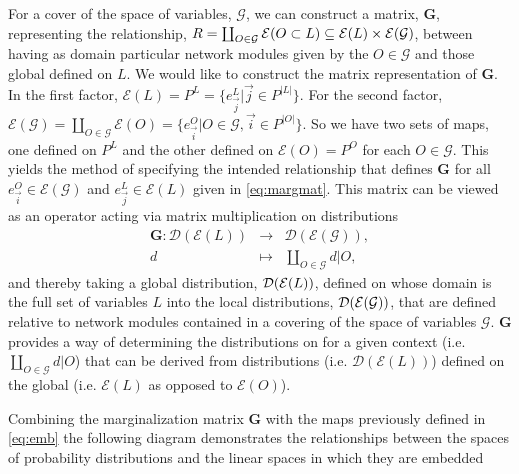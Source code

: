 For a cover of the space of variables, $\mathcal{G}$, we can construct a matrix, $\mathbf{G}$, representing the relationship, $R = \coprod_{O \in \mathcal{G}} \mathcal{E}(O \subset L) \subseteq \mathcal{E}(L) \times \mathcal{E} (\mathcal{G})$, between \gnpm{} having as domain particular network modules given by the $O \in \mathcal{G}$ and those global \gnpm{} defined on $L$. We would like to construct the matrix representation of $\mathbf{G}$. In the first factor, $\mathcal{E}(L) = P^L = \{e^{L}_{\vec{j}} | \vec{j} \in P^{|L|}\}$.
For the second factor, $ \mathcal{E}(\mathcal{G}) = \coprod_{O \in \mathcal{G}} \mathcal{E}(O) = \{e^O_{\vec{i}} | O \in \mathcal{G}, \vec{i} \in P^{|O|} \}$.
 So we have two sets of maps, one defined on $P^L$ and the other defined on $\mathcal{E}(O) = P^O$ for each $O \in \mathcal{G}$. This yields the method of specifying the intended relationship that defines $\mathbf{G}$ for all $e^O_{\vec{i}} \in \mathcal{E}(\mathcal{G})$ and $e^{L}_{\vec{j}} \in \mathcal{E}(L)$ given in \autoref{eq:margmat}.
This matrix can be viewed as an operator acting via matrix multiplication on distributions
\begin{eqnarray*}
\mathbf{G} \colon \mathcal{D}(\mathcal{E}(L)) &\rightarrow& \mathcal{D}( \mathcal{E}(\mathcal{G})),\\
d &\mapsto& \coprod_{O \in \mathcal{G}} d|O,
\end{eqnarray*}
and thereby taking a global distribution, $\mathcal{D} (\mathcal{E}(L))$, defined on \gnpm{} whose domain is the full set of variables $L$ into the local distributions, $\mathcal{D} (\mathcal{E}(\mathcal{G}))$, that are defined relative to network modules contained in a covering of the space of variables $\mathcal{G}$. $\mathbf{G}$ provides a way of determining the distributions on \gnpm{} for a given context (i.e. $\coprod_{O \in \mathcal{G}} d|O$) that can be derived from distributions (i.e. $\mathcal{D} ( \mathcal{E}(L) )$) defined on the global \gnpm{} (i.e. $\mathcal{E}(L)$ as opposed to $\mathcal{E}(O)$).

Combining the marginalization matrix $\mathbf{G}$ with the maps previously defined in \autoref{eq:emb} the following diagram demonstrates the relationships between the spaces of probability distributions and the linear spaces in which they are embedded

